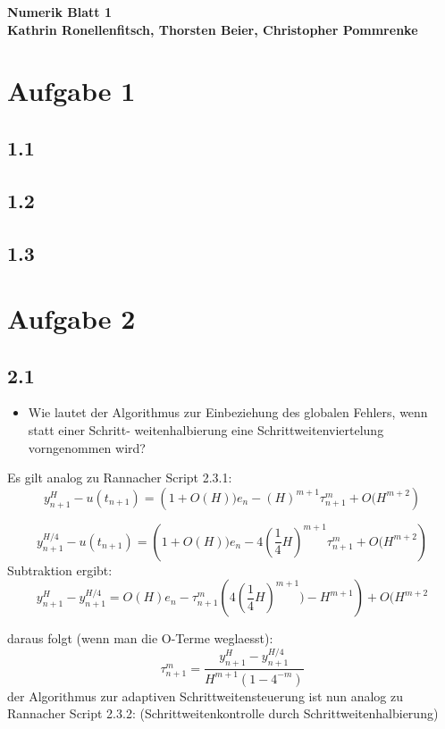 \documentclass[10pt,oneside,a4paper]{scrartcl}
\begin{document}
	\begin{center}
		\huge %
		\bfseries %
		\sffamily %
		Numerik Blatt 1\\[1em]
		\normalsize
		Kathrin Ronellenfitsch, Thorsten Beier, Christopher Pommrenke
	\end{center}

	
	\section*{Aufgabe 1}

    	\subsection*{1.1}


	\subsection*{1.2}


	\subsection*{1.3}
	
	\section*{Aufgabe 2}
	\subsection*{2.1}	
\begin{itemize}
\item Wie lautet der Algorithmus zur Einbeziehung des globalen Fehlers, wenn statt einer Schritt-
weitenhalbierung eine Schrittweitenviertelung vorngenommen wird?
\end{itemize}

Es gilt analog zu  Rannacher Script 2.3.1:
\[
y^{H}_{n+1}-u(t_{n+1})=
\left(1+O(H))e_n -(H)^{m+1}  \tau^{m}_{n+1} + O(H^{m+2}\right)
\]

\[
y^{H/4}_{n+1}-u(t_{n+1})=
\left(1+O(H))e_n -4(\frac{1}{4}H)^{m+1}  \tau^{m}_{n+1} +
O(H^{m+2}\right)
\]
Subtraktion ergibt:
\[
y^{H}_{n+1}-y^{H/4}_{n+1}=
O(H)e_n- \tau^{m}_{n+1}
\left(4(\frac{1}{4}H)^{m+1}) - H^{m+1} \right) +
O(H^{m+2}
\]

daraus folgt (wenn man die O-Terme weglaesst):
\[
\tau^{m}_{n+1}=
\frac{y^{H}_{n+1}-y^{H/4}_{n+1}}
{H^{m+1}(1-4^{-m})}
\]
der Algorithmus zur adaptiven Schrittweitensteuerung
ist nun analog zu Rannacher Script 2.3.2: (Schrittweitenkontrolle durch Schrittweitenhalbierung)
\end{document}
